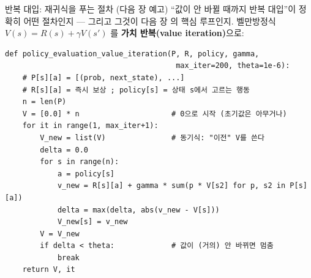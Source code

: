 \documentclass[aspectratio=169,11pt]{beamer}
\begin{document}
\begin{frame}[fragile]{반복 대입: 재귀식을 푸는 절차 (다음 장 예고)}
  ``값이 안 바뀔 때까지 반복 대입''이 정확히 어떤 절차인지 ---
  그리고 그것이 다음 장 의 핵심 루프인지. 벨만방정식
  $V(s) = R(s) + \gamma V(s')$ 를 \textbf{가치 반복(value
  iteration)}으로:
  \begin{lstlisting}
def policy_evaluation_value_iteration(P, R, policy, gamma,
                                       max_iter=200, theta=1e-6):
    # P[s][a] = [(prob, next_state), ...]
    # R[s][a] = 즉시 보상 ; policy[s] = 상태 s에서 고르는 행동
    n = len(P)
    V = [0.0] * n                     # 0으로 시작 (초기값은 아무거나)
    for it in range(1, max_iter+1):
        V_new = list(V)               # 동기식: "이전" V를 쓴다
        delta = 0.0
        for s in range(n):
            a = policy[s]
            v_new = R[s][a] + gamma * sum(p * V[s2] for p, s2 in P[s][a])
            delta = max(delta, abs(v_new - V[s]))
            V_new[s] = v_new
        V = V_new
        if delta < theta:             # 값이 (거의) 안 바뀌면 멈춤
            break
    return V, it
  \end{lstlisting}
\end{frame}

\end{document}
